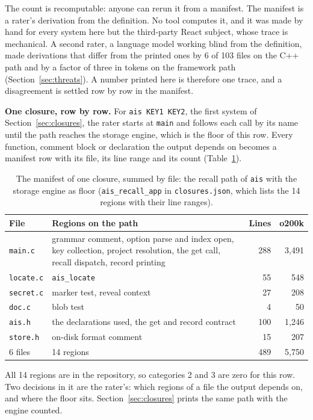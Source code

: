 \documentclass[journal]{IEEEtran}
\begin{document}
The count is recomputable: anyone can rerun it from a manifest. The
manifest is a rater's derivation from the definition. No tool computes
it, and it was made by hand for every system here but the third-party
React subject, whose trace is mechanical. A second rater, a language
model working blind from the definition, made derivations that
differ from the printed ones by 6 of 103 files on the C++ path and by
a factor of three in tokens on the framework path
(Section~\ref{sec:threats}). A number printed here is therefore one
trace, and a disagreement is settled row by row in the manifest.

\textbf{One closure, row by row.} For \texttt{ais KEY1 KEY2}, the first
system of Section~\ref{sec:closures}, the rater starts at \texttt{main}
and follows each call by its name until the path reaches the storage
engine, which is the floor of this row. Every function, comment block
or declaration the output depends on becomes a manifest row with its
file, its line range and its count (Table~\ref{tab:worked}).

\begin{table}[!t]
\centering
\footnotesize\setlength{\tabcolsep}{3pt}
\begin{tabular}{@{}lp{4.1cm}rr@{}}
\toprule
File & Regions on the path & Lines & o200k \\
\midrule
\texttt{main.c} & grammar comment, option parse and index open, key collection, project resolution, the get call, recall dispatch, record printing & 288 & 3{,}491 \\
\texttt{locate.c} & \texttt{ais\_locate} & 55 & 548 \\
\texttt{secret.c} & marker test, reveal context & 27 & 208 \\
\texttt{doc.c} & blob test & 4 & 50 \\
\texttt{ais.h} & the declarations used, the get and record contract & 100 & 1{,}246 \\
\texttt{store.h} & on-disk format comment & 15 & 207 \\
\midrule
6 files & 14 regions & 489 & 5{,}750 \\
\bottomrule
\end{tabular}
\caption{The manifest of one closure, summed by file: the recall path of
\texttt{ais} with the storage engine as floor
(\texttt{ais\_recall\_app} in \texttt{closures.json}, which lists the 14
regions with their line ranges).}
\label{tab:worked}
\end{table}

All 14 regions are in the repository, so categories 2 and 3 are zero for
this row. Two decisions in it are the rater's: which regions of a file
the output depends on, and where the floor sits.
Section~\ref{sec:closures} prints the same path with the engine counted.
\end{document}
